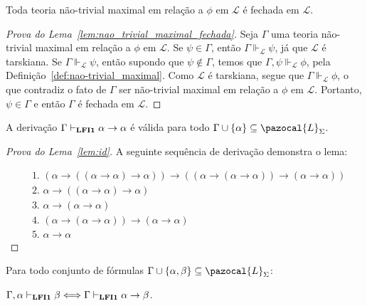     \begin{lema}
        \label{lem:nao_trivial_maximal_fechada}
        Toda teoria não-trivial maximal em relação a $\phi$ em $\mathcal{L}$ é fechada em $\mathcal{L}$.
    \end{lema}

    \begin{proof}[Prova do Lema~\ref{lem:nao_trivial_maximal_fechada}]
        Seja $\Gamma$ uma teoria não-trivial maximal em relação a $\phi$ em $\mathcal{L}$. Se $\psi \in \Gamma$, então $\Gamma \Vdash_{\mathcal{L}} \psi$, já que $\mathcal{L}$ é tarskiana. Se $\Gamma \Vdash_{\mathcal{L}} \psi$, então supondo que $\psi \notin \Gamma$, temos que $\Gamma, \psi \Vdash_{\mathcal{L}} \phi$, pela Definição~\ref{def:nao-trivial_maximal}. Como $\mathcal{L}$ é tarskiana, segue que $\Gamma \Vdash_{\mathcal{L}} \phi$, o que contradiz o fato de $\Gamma$ ser não-trivial maximal em relação a $\phi$ em $\mathcal{L}$. Portanto, $\psi \in \Gamma$ e então $\Gamma$ é fechada em $\mathcal{L}$.
    \end{proof}

    
    \begin{lema}
        \label{lem:id}
        A derivação $\Gamma \vdash_{\textbf{LFI1}{}} \alpha \to \alpha$ é válida para todo $\Gamma \cup \{\alpha\} \subseteq \pazocal{L}_{\Sigma}$.
    \end{lema}
    
    \begin{proof}[Prova do Lema~\ref{lem:id}]
        A seguinte sequência de derivação demonstra o lema:
        
        \begin{align*}
            & \text{1. } (\alpha \to ((\alpha \to \alpha) \to \alpha)) \to ((\alpha \to (\alpha \to \alpha)) \to (\alpha \to \alpha))\tag{Ax2}\\
            & \text{2. } \alpha \to ((\alpha \to \alpha) \to \alpha)\tag{Ax1}\\
            & \text{3. } \alpha \to (\alpha \to \alpha)\tag{Ax1}\\
            & \text{4. } (\alpha \to (\alpha \to \alpha)) \to (\alpha \to \alpha)\tag{MP 1,2}\\
            & \text{5. } \alpha \to \alpha\tag{MP 3,4}
        \end{align*}
    \end{proof}
    
    
    \begin{teorema}
        \label{teo:deducao}
        Para todo conjunto de fórmulas $\Gamma \cup \{\alpha, \beta \} \subseteq \pazocal{L}_{\Sigma}$:

        \centering
        $\Gamma, \alpha \vdash_{\textbf{LFI1}{}} \beta \Longleftrightarrow \Gamma \vdash_{\textbf{LFI1}{}} \alpha \to \beta$.
    \end{teorema}

